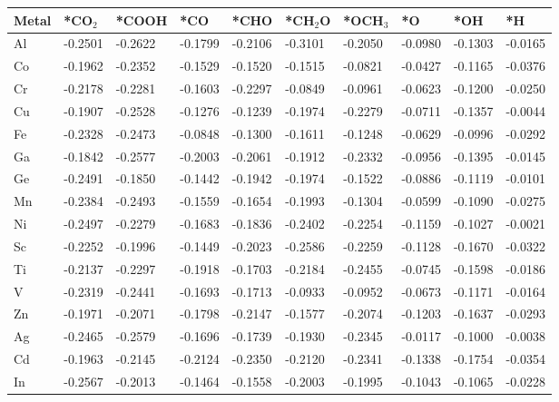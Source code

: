 \begin{table}[h]
  \centering
  {\fontsize{6}{12}\selectfont
  \begin{tabular}{*{10}{l}}
      \hline
      Metal & *CO$_2$ & *COOH& *CO     & *CHO    & *CH$_2$O& *OCH$_3$& *O      & *OH     & *H      \\
      \hline
      Al & -0.2501 & -0.2622 & -0.1799 & -0.2106 & -0.3101 & -0.2050 & -0.0980 & -0.1303 & -0.0165 \\
      Co & -0.1962 & -0.2352 & -0.1529 & -0.1520 & -0.1515 & -0.0821 & -0.0427 & -0.1165 & -0.0376 \\
      Cr & -0.2178 & -0.2281 & -0.1603 & -0.2297 & -0.0849 & -0.0961 & -0.0623 & -0.1200 & -0.0250 \\
      Cu & -0.1907 & -0.2528 & -0.1276 & -0.1239 & -0.1974 & -0.2279 & -0.0711 & -0.1357 & -0.0044 \\
      Fe & -0.2328 & -0.2473 & -0.0848 & -0.1300 & -0.1611 & -0.1248 & -0.0629 & -0.0996 & -0.0292 \\
      Ga & -0.1842 & -0.2577 & -0.2003 & -0.2061 & -0.1912 & -0.2332 & -0.0956 & -0.1395 & -0.0145 \\
      Ge & -0.2491 & -0.1850 & -0.1442 & -0.1942 & -0.1974 & -0.1522 & -0.0886 & -0.1119 & -0.0101 \\
      Mn & -0.2384 & -0.2493 & -0.1559 & -0.1654 & -0.1993 & -0.1304 & -0.0599 & -0.1090 & -0.0275 \\
      Ni & -0.2497 & -0.2279 & -0.1683 & -0.1836 & -0.2402 & -0.2254 & -0.1159 & -0.1027 & -0.0021 \\
      Sc & -0.2252 & -0.1996 & -0.1449 & -0.2023 & -0.2586 & -0.2259 & -0.1128 & -0.1670 & -0.0322 \\
      Ti & -0.2137 & -0.2297 & -0.1918 & -0.1703 & -0.2184 & -0.2455 & -0.0745 & -0.1598 & -0.0186 \\
      V  & -0.2319 & -0.2441 & -0.1693 & -0.1713 & -0.0933 & -0.0952 & -0.0673 & -0.1171 & -0.0164 \\
      Zn & -0.1971 & -0.2071 & -0.1798 & -0.2147 & -0.1577 & -0.2074 & -0.1203 & -0.1637 & -0.0293 \\
      Ag & -0.2465 & -0.2579 & -0.1696 & -0.1739 & -0.1930 & -0.2345 & -0.0117 & -0.1000 & -0.0038 \\
      Cd & -0.1963 & -0.2145 & -0.2124 & -0.2350 & -0.2120 & -0.2341 & -0.1338 & -0.1754 & -0.0354 \\
      In & -0.2567 & -0.2013 & -0.1464 & -0.1558 & -0.2003 & -0.1995 & -0.1043 & -0.1065 & -0.0228 \\

\end{tabular}}
\end{table}
